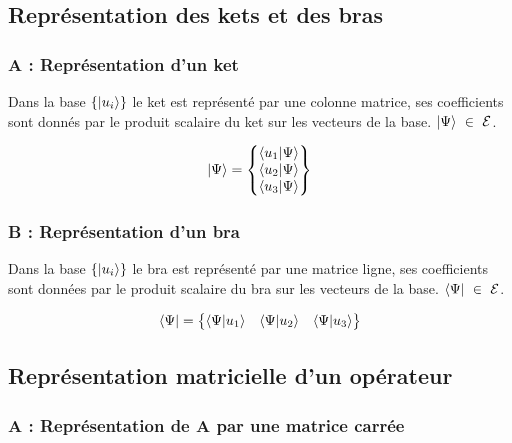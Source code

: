 \documentclass[12pt,a4paper,titlepage]{book}
\begin{document}
\subsection{Représentation des kets et des bras}
\subsubsection{A : Représentation d'un ket}

Dans la base $\lbrace \ket{u_i} \rbrace$ le ket est représenté par une colonne matrice, ses coefficients sont donnés par le produit scalaire du ket sur les vecteurs de la base. $\ket{\Psi} ~\in~ \mathcal{E}$.\\

\begin{center}
\[
\ket{\Psi}=
\left\lbrace
\begin{matrix}
\braket{u_1 | \Psi}\\
\braket{u_2 | \Psi}\\
\braket{u_3 | \Psi}
\end{matrix}
\right\rbrace
\]
\end{center}

\subsubsection{B : Représentation d'un bra}

Dans la base $\lbrace \ket{u_i} \rbrace$ le bra est représenté par une matrice ligne, ses coefficients sont données par le produit scalaire du bra sur les vecteurs de la base. $\bra{\Psi} ~\in~ \mathcal{E}$.\\

\begin{center}
\[
\bra{\Psi}=
\left\lbrace
\begin{matrix}
\braket{\Psi | u_1} & \braket{\Psi | u_2} & \braket{\Psi | u_3}\\
\end{matrix}
\right\rbrace
\]
\end{center}

\subsection{Représentation matricielle d'un opérateur}
\subsubsection{A : Représentation de A par une matrice carrée}
\end{document}
